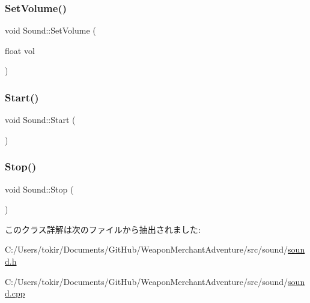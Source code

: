 \mbox{\label{class_sound_a993eee69f61611ca1b4621ea0952e2c8}} 
\subsubsection{\texorpdfstring{Set\+Volume()}{SetVolume()}}
{\footnotesize\ttfamily void Sound\+::\+Set\+Volume (\begin{DoxyParamCaption}\item[{float}]{vol }\end{DoxyParamCaption})\hspace{0.3cm}{\ttfamily [inline]}}

\mbox{\label{class_sound_ae021b518e93d7d8c6f3ea951cd4b98d8}} 
\subsubsection{\texorpdfstring{Start()}{Start()}}
{\footnotesize\ttfamily void Sound\+::\+Start (\begin{DoxyParamCaption}{ }\end{DoxyParamCaption})\hspace{0.3cm}{\ttfamily [inline]}}

\mbox{\label{class_sound_a188de6836d531813da378464e392e813}} 
\subsubsection{\texorpdfstring{Stop()}{Stop()}}
{\footnotesize\ttfamily void Sound\+::\+Stop (\begin{DoxyParamCaption}{ }\end{DoxyParamCaption})\hspace{0.3cm}{\ttfamily [inline]}}



このクラス詳解は次のファイルから抽出されました\+:\begin{DoxyCompactItemize}
\item 
C\+:/\+Users/tokir/\+Documents/\+Git\+Hub/\+Weapon\+Merchant\+Adventure/src/sound/\mbox{\hyperlink{sound_8h}{sound.\+h}}\item 
C\+:/\+Users/tokir/\+Documents/\+Git\+Hub/\+Weapon\+Merchant\+Adventure/src/sound/\mbox{\hyperlink{sound_8cpp}{sound.\+cpp}}\end{DoxyCompactItemize}
